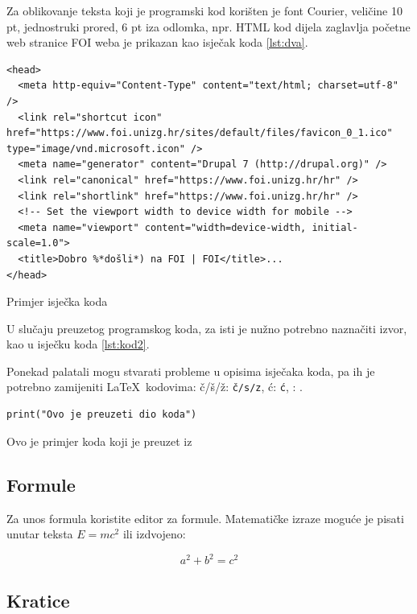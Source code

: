 \documentclass[]{foi}
\begin{document}
Za oblikovanje teksta koji je programski kod korišten je font Courier, veličine 10 pt, jednostruki prored, 6 pt iza odlomka, npr. HTML kod dijela zaglavlja početne web stranice FOI weba je prikazan kao isječak koda \ref{lst:dva}.

\begin{listing}
	\begin{verbatim}
<head>
  <meta http-equiv="Content-Type" content="text/html; charset=utf-8" />
  <link rel="shortcut icon" href="https://www.foi.unizg.hr/sites/default/files/favicon_0_1.ico" type="image/vnd.microsoft.icon" />
  <meta name="generator" content="Drupal 7 (http://drupal.org)" />
  <link rel="canonical" href="https://www.foi.unizg.hr/hr" />
  <link rel="shortlink" href="https://www.foi.unizg.hr/hr" />
  <!-- Set the viewport width to device width for mobile -->
  <meta name="viewport" content="width=device-width, initial-scale=1.0">
  <title>Dobro %*došli*) na FOI | FOI</title>...
</head>
    \end{verbatim}
	\caption{Primjer isječka koda}
	\label{lst:dva}
\end{listing}

U slučaju preuzetog programskog koda, za isti je nužno potrebno naznačiti izvor, kao u isječku koda \ref{lst:kod2}.

Ponekad palatali mogu stvarati probleme u opisima isječaka koda, pa ih je potrebno zamijeniti \LaTeX\ kodovima: \v{c}/\v{s}/\v{z}: \texttt{\v{c/s/z}}, \'{c}: \texttt{\'{c}}, \dj: \texttt{\dj}.


\begin{listing}
	\begin{verbatim}
print("Ovo je preuzeti dio koda")
    \end{verbatim}
	\caption[Ovo je primjer koda koji je preuzet]{Ovo je primjer koda koji je preuzet iz \cite[str. 23]{russell2022ArtificialIntelligenceModern}}
	\label{lst:kod2}
\end{listing}



\subsection{Formule}

Za unos formula koristite editor za formule. Matematičke izraze moguće je pisati unutar teksta $E = mc^2$ ili izdvojeno:

$$
	a^2 + b^2 = c^2
$$

\subsection{Kratice}
\end{document}
